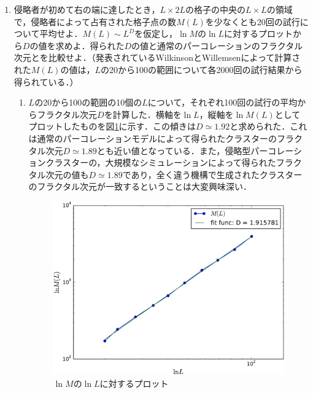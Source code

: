 \documentclass{jsarticle}
\begin{document}
\begin{enumerate}
\begin{enumerate}
            \end{enumerate}    
        
        \item 侵略者が初めて右の端に達したとき，$L\times 2L$の格子の中央の$L\times L$の領域で，侵略者によって占有された格子点の数$M(L)$を少なくとも20回の試行について平均せよ．$M(L) \sim L^{D}$を仮定し，$\ln M$の$\ln L$に対するプロットから$D$の値を求めよ．得られた$D$の値と通常のパーコレーションのフラクタル次元とを比較せよ．（発表されているWilkinsonとWillemsenによって計算された$M(L)$の値は，$L$の20から100の範囲について各2000回の試行結果から得られている．）
        
            \begin{enumerate}
                \item $L$の20から100の範囲の10個の$L$について，それぞれ100回の試行の平均からフラクタル次元$D$を計算した．横軸を$\ln L$，縦軸を$\ln M(L)$としてプロットしたものを図\ref{fig:14-7-f2}に示す．この傾きは$D\simeq 1.92$と求められた．これは通常のパーコレーションモデルによって得られたクラスターのフラクタル次元$D\simeq 1.89$とも近い値となっている．また，侵略型パーコレーションクラスターの，大規模なシミュレーションによって得られたフラクタル次元の値も$D\simeq 1.89$であり，全く違う機構で生成されたクラスターのフラクタル次元が一致するということは大変興味深い．
                
                \begin{figure}[H]
                    \begin{center}
                        \includegraphics[width=12.0cm]{figure_2.pdf}
                        \caption{$\ln M$の$\ln L$に対するプロット}
                        \label{fig:14-7-f2}
                    \end{center}
                \end{figure}
                
            \end{enumerate} 
        
    \end{enumerate}
\end{document}
